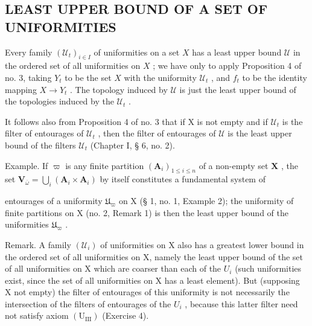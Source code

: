 \subsection{LEAST UPPER BOUND OF A SET OF UNIFORMITIES}

Every family \((\mathcal{U}_t)_{i\in I}\) of uniformities on a set \(X\) has a least upper bound \(\mathcal{U}\) in the ordered set of all uniformities on \(X\) ; we have only to apply Proposition 4 of no. 3, taking \(Y_t\) to be the set \(X\) with the uniformity \(\mathcal{U}_t\) , and \(f_t\) to be the identity mapping \(X\to Y_t\) . The topology induced by \(\mathcal{U}\) is just the least upper bound of the topologies induced by the \(\mathcal{U}_t\) .

It follows also from Proposition 4 of no. 3 that if X is not empty and if \(\mathcal{U}_{t}\) is the filter of entourages of \(\mathcal{U}_{t}\) , then the filter of entourages of \(\mathcal{U}\) is the least upper bound of the filters \(\mathcal{U}_{t}\) (Chapter I, § 6, no. 2).

Example. If \(\varpi\) is any finite partition \((\mathbf{A}_i)_{1 \leqslant i \leqslant n}\) of a non-empty set \(\mathbf{X}\) , the set \(\mathbf{V}_{\overline{\omega}} = \bigcup_{i} (\mathbf{A}_i \times \mathbf{A}_i)\) by itself constitutes a fundamental system of

entourages of a uniformity \(\mathfrak{U}_{\varpi}\) on X (§ 1, no. 1, Example 2); the uniformity of finite partitions on X (no. 2, Remark 1) is then the least upper bound of the uniformities \(\mathfrak{U}_{\varpi}\) .

Remark. A family \((\mathcal{U}_{i})\) of uniformities on X also has a greatest lower bound in the ordered set of all uniformities on X, namely the least upper bound of the set of all uniformities on X which are coarser than each of the \(U_{i}\) (such uniformities exist, since the set of all uniformities on X has a least element). But (supposing X not empty) the filter of entourages of this uniformity is not necessarily the intersection of the filters of entourages of the \(U_{i}\) , because this latter filter need not satisfy axiom \((\mathrm{U}_{\mathrm{III}})\) (Exercise 4).

